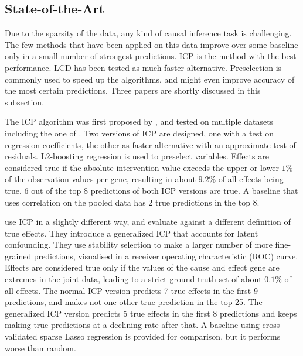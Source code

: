 \subsection{State-of-the-Art}

Due to the sparsity of the data, any kind of causal inference task is challenging. The few methods that have been applied on this data improve over some baseline only in a small number of strongest predictions. ICP is the method with the best performance. LCD has been tested as much faster alternative. Preselection is commonly used to speed up the algorithms, and might even improve accuracy of the most certain predictions. Three papers are shortly discussed in this subsection.

The ICP algorithm was first proposed by \textbf{\citet{peters2016causal}}, and tested on multiple datasets including the one of \citet{kemmeren2014large}. Two versions of ICP are designed, one with a test on regression coefficients, the other as faster alternative with an approximate test of residuals. L2-boosting regression \citep{schapire1998boosting} is used to preselect variables. Effects are considered true if the absolute intervention value exceeds the upper or lower $1\%$ of the observation values per gene, resulting in about $9.2\%$ of all effects being true. 6 out of the top 8 predictions of both ICP versions are true. A baseline that uses correlation on the pooled data has 2 true predictions in the top 8.

\textbf{\citet{meinshausen2016methods}} use ICP in a slightly different way, and evaluate against a different definition of true effects. They introduce a generalized ICP that accounts for latent confounding. They use stability selection \citep{meinshausen2010stability} to make a larger number of more fine-grained predictions, visualised in a receiver operating characteristic (ROC) curve. Effects are considered true only if the values of the cause and effect gene are extremes in the joint data, leading to a strict ground-truth set of about $0.1\%$ of all effects. The normal ICP version predicts 7 true effects in the first 9 predictions, and makes not one other true prediction in the top 25. The generalized ICP version predicts 5 true effects in the first 8 predictions and keeps making true predictions at a declining rate after that. A baseline using cross-validated sparse Lasso regression is provided for comparison, but it performs worse than random.

